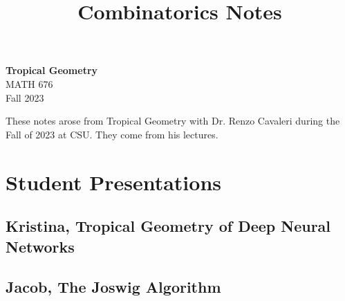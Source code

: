 \documentclass[11pt]{article}
\theoremstyle{definition}
\begin{document}
\title{Combinatorics Notes}




\thispagestyle{empty}


\begin{center}
{\LARGE \bf Tropical Geometry}\\
{\large MATH 676}\\
Fall 2023
\end{center}

These notes arose from Tropical Geometry with Dr. Renzo Cavaleri during the Fall of 2023 at CSU. They come from his lectures.



\newpage




























    



 











\section{Student Presentations}


\subsection{Kristina, Tropical Geometry of Deep Neural Networks}

\subsection{Jacob, The Joswig Algorithm}
\end{document}
